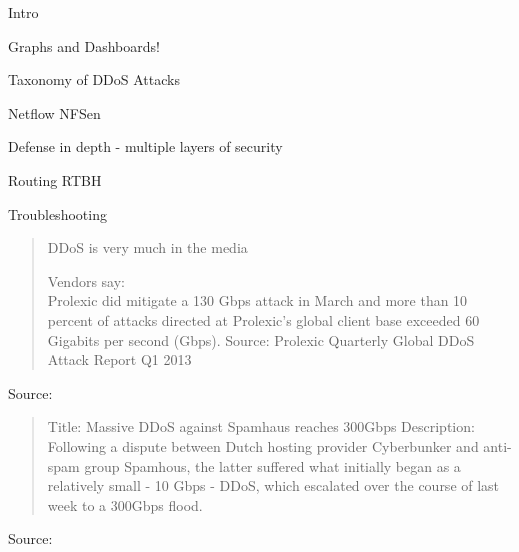 \documentclass[20pt,landscape,a4paper,footrule]{foils}
\begin{document}
{}


\begin{list1}
\item Intro
\item Graphs and Dashboards!
\item Taxonomy of DDoS Attacks
\item Netflow NFSen
\item Defense in depth - multiple layers of security
\item Routing RTBH
\item Troubleshooting
\end{list1}



\begin{quote}
DDoS is very much in the media

Vendors say:\\
Prolexic did mitigate a 130 Gbps attack in March and more than 10 percent of attacks directed at Prolexic's global client base exceeded 60 Gigabits per second (Gbps). Source: Prolexic Quarterly Global DDoS Attack Report Q1 2013

\end{quote}



{\small{}}


Source: 

\begin{quote}
Title: Massive DDoS against Spamhaus reaches 300Gbps
Description: Following a dispute between Dutch hosting provider
Cyberbunker and anti-spam group Spamhous, the latter suffered what
initially began as a relatively small - 10 Gbps - DDoS, which escalated
over the course of last week to a 300Gbps flood.
\end{quote}

{\small Source:
}

\end{document}
